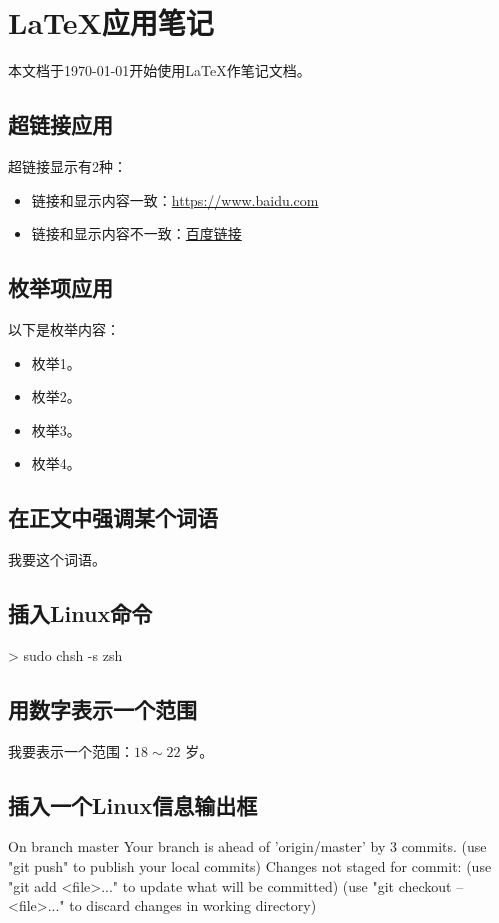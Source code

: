 \section{\LaTeX 应用笔记}
本文档于\today 开始使用\LaTeX 作笔记文档。

\subsection{超链接应用}
超链接显示有2种：
\begin{itemize}
\item 链接和显示内容一致：\url{https://www.baidu.com}
\item 链接和显示内容不一致：\href{https://www.baidu.com}{百度链接}
\end{itemize}

\subsection{枚举项应用}
以下是枚举内容：
\begin{itemize}
\item 枚举1。
\item 枚举2。
\item 枚举3。
\item 枚举4。
\end{itemize}


\subsection{在正文中强调某个词语}
我要这个词语。

\subsection{插入Linux命令}
\begin{commandbox}
 > sudo chsh -s zsh
\end{commandbox}

\subsection{用数字表示一个范围}
我要表示一个范围：$18\sim22$ 岁。

\subsection{插入一个Linux信息输出框}
\begin{messagebox}
On branch master
Your branch is ahead of 'origin/master' by 3 commits.
  (use "git push" to publish your local commits)
Changes not staged for commit:
  (use "git add <file>..." to update what will be committed)
  (use "git checkout -- <file>..." to discard changes in working directory)
\end{messagebox}

